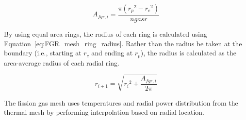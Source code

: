 \begin{equation}
    A_{fgr,i} = \frac{\pi\left( {r_{p}}^{2} - {r_{c}}^{2} \right)}{ngasr}
    \label{eq:FGR_mesh}
\end{equation}

By using equal area rings, the radius of each ring is calculated using
Equation~\ref{eq:FGR_mesh_ring_radius}. Rather than the radius be taken at the boundary (i.e.,
starting at \(r_{c}\) and ending at \(r_{p}\)), the radius is calculated as the area-average radius
of each radial ring.

\begin{equation}
    r_{i + 1} = \sqrt{{r_{i}}^{2} + \frac{A_{fgr,i}}{2\pi}}
    \label{eq:FGR_mesh_ring_radius}
\end{equation}

The fission gas mesh uses temperatures and radial power distribution from the thermal mesh by
performing interpolation based on radial location.
